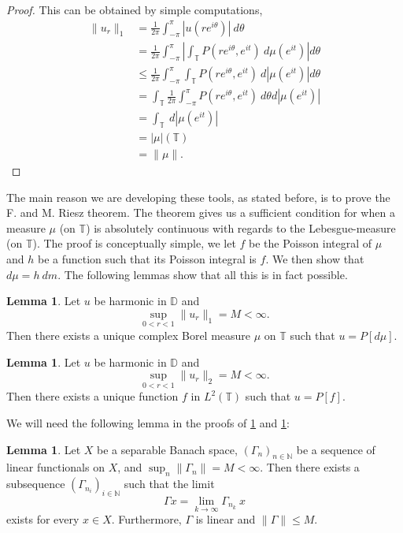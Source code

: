 \documentclass[a4paper,12pt,twoside,BCOR=10mm]{scrbook}
\theoremstyle{definition}
\theoremstyle{definition}
\newtheorem{lemma}[theorem]{Lemma}
\theoremstyle{definition}
\begin{document}
\begin{proof}
This can be obtained by simple computations,
\begin{align*}
	\|u_r\|_1
	&= \frac{1}{2\pi} \int_{-\pi}^{\pi} |u(re^{i\theta})|\ d\theta\\
	&= \frac{1}{2\pi} \int_{-\pi}^{\pi} \left | \int_{\mathbb{T}} P(re^{i\theta}, e^{it})\ d\mu(e^{it}) \right | d\theta\\
	&\leq \frac{1}{2\pi} \int_{-\pi}^{\pi} \int_{\mathbb{T}} P(re^{i\theta}, e^{it})\ d|\mu(e^{it})| d\theta\\
	&= \int_{\mathbb{T}} \frac{1}{2\pi} \int_{-\pi}^{\pi} P(re^{i\theta}, e^{it})\ d\theta d|\mu(e^{it})|\\ 
	&= \int_{\mathbb{T}}\ d|\mu(e^{it})|\\
	&= |\mu|(\mathbb{T})\\
	&= \|\mu\|.
\end{align*}
\end{proof}
The main reason we are developing these tools, as stated before, is to prove the F. and M. Riesz theorem.
The theorem gives us a sufficient condition for when a measure $\mu$ (on $\mathbb{T}$) is absolutely continuous with regards to the Lebesgue-measure (on $\mathbb{T}$).
The proof is conceptually simple, we let $f$ be the Poisson integral of $\mu$ and $h$ be a function such that its Poisson integral is $f$.
We then show that $d\mu = h\ dm$. %
The following lemmas show that all this is in fact possible.
\begin{lemma}
\label{FMRlemma3}
Let $u$ be harmonic in $\mathbb{D}$ and
\[
	\sup_{0 < r < 1} \|u_r\|_1 = M < \infty.
\]
Then there exists a unique complex Borel measure $\mu$ on $\mathbb{T}$ such that $u = P[d\mu]$.
\end{lemma}
\begin{lemma}
\label{FMRlemma3b}
Let $u$ be harmonic in $\mathbb{D}$ and
\[
	\sup_{0 < r < 1} \|u_r\|_2 = M < \infty.
\]
Then there exists a unique function $f$ in $L^2(\mathbb{T})$ such that $u = P[f]$.
\end{lemma}
We will need the following lemma in the proofs of \ref{FMRlemma3} and \ref{FMRlemma3b}:
\begin{lemma}
\label{FMRlemma31}
Let $X$ be a separable Banach space,
	$(\Gamma_n)_{n \in \mathbb{N}}$ be a sequence of linear functionals on $X$,
	and $\sup_n \|\Gamma_n\| = M < \infty$.
Then there exists a subsequence $(\Gamma_{n_i})_{i \in \mathbb{N}}$ such that the limit 
\[
	\Gamma x = \lim_{k \rightarrow \infty} \Gamma_{n_k}\ x
\]
exists for every $x \in X$.
Furthermore, $\Gamma$ is linear and $\|\Gamma\| \leq M$.
\end{lemma}
\end{document}
